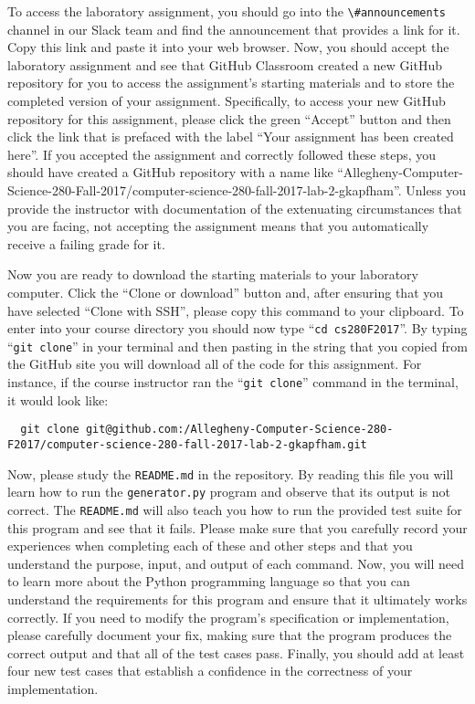 \documentclass[11pt]{article}
\newcommand{\mainprogram}{\lstinline{generator.py}}
\newcommand{\reflection}{\lstinline{README.md}}
\newcommand{\command}[1]{``\lstinline{#1}''}
\newcommand{\channel}[1]{\lstinline{#1}}
\begin{document}
To access the laboratory assignment, you should go into the \channel{\#announcements} channel in our Slack team and find
the announcement that provides a link for it. Copy this link and paste it into your web browser. Now, you should accept
the laboratory assignment and see that GitHub Classroom created a new GitHub repository for you to access the
assignment's starting materials and to store the completed version of your assignment. Specifically, to access your new
GitHub repository for this assignment, please click the green ``Accept'' button and then click the link that is prefaced
with the label ``Your assignment has been created here''. If you accepted the assignment and correctly followed these
steps, you should have created a GitHub repository with a name like
``Allegheny-Computer-Science-280-Fall-2017/computer-science-280-fall-2017-lab-2-gkapfham''. Unless you provide the
instructor with documentation of the extenuating circumstances that you are facing, not accepting the assignment means
that you automatically receive a failing grade for it.

Now you are ready to download the starting materials to your laboratory computer. Click the ``Clone or download'' button
and, after ensuring that you have selected ``Clone with SSH'', please copy this command to your clipboard. To enter into
your course directory you should now type \command{cd cs280F2017}. By typing \command{git clone} in your terminal and then
pasting in the string that you copied from the GitHub site you will download all of the code for this assignment. For
instance, if the course instructor ran the \command{git clone} command in the terminal, it would look like:

\begin{lstlisting}
  git clone git@github.com:/Allegheny-Computer-Science-280-F2017/computer-science-280-fall-2017-lab-2-gkapfham.git
\end{lstlisting}

Now, please study the \reflection{} in the repository. By reading this file you will learn how to run the \mainprogram{}
program and observe that its output is not correct. The \reflection{} will also teach you how to run the provided test
suite for this program and see that it fails. Please make sure that you carefully record your experiences when
completing each of these and other steps and that you understand the purpose, input, and output of each command. Now,
you will need to learn more about the Python programming language so that you can understand the requirements for this
program and ensure that it ultimately works correctly. If you need to modify the program's specification or
implementation, please carefully document your fix, making sure that the program produces the correct output and that
all of the test cases pass. Finally, you should add at least four new test cases that establish a confidence in the
correctness of your implementation.
\end{document}
